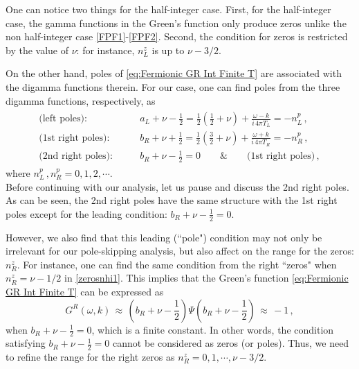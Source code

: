 \documentclass[11pt,a4paper]{article}
\begin{document}
One can notice two things for the half-integer case.
First, for the half-integer case, the gamma functions in the Green's function only produce zeros unlike the non half-integer case \eqref{FPF1}-\eqref{FPF2}.
Second, the condition for zeros is restricted by the value of $\nu$: for instance, $n^z_L$ is up to $\nu-3/2$.

On the other hand, poles of \eqref{eq:Fermionic GR Int Finite T} are associated with the digamma functions therein. For our case, one can find poles from the three digamma functions, respectively, as
\begin{align}\label{polesnhi1}
\begin{split}
    \text{(left poles):} \qquad & {a}_L+\nu-\frac{1}{2} = \frac{1}{2}\left(  \frac{1}{2} + \nu\right) + \frac{\omega-k}{i\, 4 \pi T_L} = - n^p_L\,,\\
    \text{(1st right poles):} \qquad & {b}_R+\nu+\frac{1}{2} = \frac{1}{2}\left( \frac{3}{2} + \nu \right) + \frac{\omega+k}{i\, 4 \pi T_R} = - n^p_R\,, \\ 
    \text{(2nd right poles):} \qquad & {b}_R+\nu-\frac{1}{2} = 0  \qquad\&\qquad  \text{(1st right poles)} \,,
\end{split}
\end{align}
where $n^p_L\,,n^p_R = 0,1,2,\cdots$.\\

Before continuing with our analysis, let us pause and discuss the 2nd right poles.
As can be seen, the 2nd right poles have the same structure with the 1st right poles except for the leading condition: $b_R + \nu - \frac{1}{2}=0$.

However, we also find that this leading (``pole") condition may not only be irrelevant for our pole-skipping analysis, but also affect on the range for the zeros: $n_R^z$.
For instance, one can find the same condition from the right ``zeros" when $n_R^z = \nu-1/2$ in \eqref{zerosnhi1}.
This implies that the Green's function \eqref{eq:Fermionic GR Int Finite T} can be expressed as
\begin{equation} \label{DSRBE33}
{G}^R(\omega, k)  \,\approx\, \left(b_{R}+\nu-\frac{1}{2}\right) \Psi\left({b}_R+\nu-\frac{1}{2}\right) \,\approx\, -1 \,,
\end{equation}
when $b_R + \nu - \frac{1}{2}=0$, which is a finite constant. In other words, the condition satisfying $b_R + \nu - \frac{1}{2}=0$ cannot be considered as zeros (or poles). Thus, we need to refine the range for the right zeros as $n^z_R=0,1,\cdots, \nu-{3}/{2}$.\\
\end{document}
